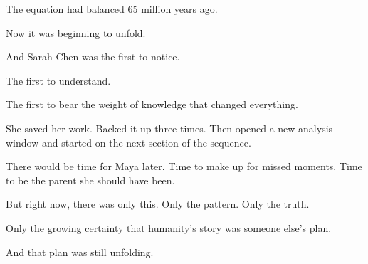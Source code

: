 The equation had balanced 65 million years ago.

Now it was beginning to unfold.

And Sarah Chen was the first to notice.

The first to understand.

The first to bear the weight of knowledge that changed everything.

She saved her work. Backed it up three times. Then opened a new analysis window and started on the next section of the sequence.

There would be time for Maya later. Time to make up for missed moments. Time to be the parent she should have been.

But right now, there was only this. Only the pattern. Only the truth.

Only the growing certainty that humanity's story was someone else's plan.

And that plan was still unfolding.

